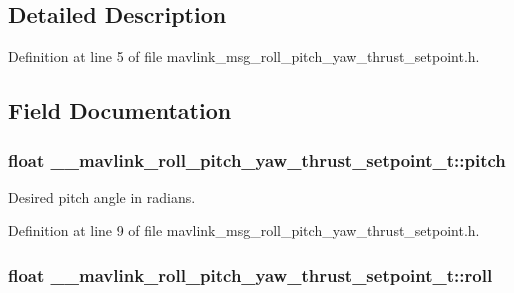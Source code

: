 \subsection{Detailed Description}


Definition at line 5 of file mavlink\-\_\-msg\-\_\-roll\-\_\-pitch\-\_\-yaw\-\_\-thrust\-\_\-setpoint.\-h.



\subsection{Field Documentation}
\hypertarget{struct____mavlink__roll__pitch__yaw__thrust__setpoint__t_ab78c4ce224140fd9692ca648e8e59a78}{
\subsubsection[{pitch}]{\setlength{\rightskip}{0pt plus 5cm}float \-\_\-\-\_\-mavlink\-\_\-roll\-\_\-pitch\-\_\-yaw\-\_\-thrust\-\_\-setpoint\-\_\-t\-::pitch}}\label{struct____mavlink__roll__pitch__yaw__thrust__setpoint__t_ab78c4ce224140fd9692ca648e8e59a78}


Desired pitch angle in radians. 



Definition at line 9 of file mavlink\-\_\-msg\-\_\-roll\-\_\-pitch\-\_\-yaw\-\_\-thrust\-\_\-setpoint.\-h.

\hypertarget{struct____mavlink__roll__pitch__yaw__thrust__setpoint__t_a8b5fda6cd64d2c127b71f8c6328c1ff3}{
\subsubsection[{roll}]{\setlength{\rightskip}{0pt plus 5cm}float \-\_\-\-\_\-mavlink\-\_\-roll\-\_\-pitch\-\_\-yaw\-\_\-thrust\-\_\-setpoint\-\_\-t\-::roll}}\label{struct____mavlink__roll__pitch__yaw__thrust__setpoint__t_a8b5fda6cd64d2c127b71f8c6328c1ff3}


